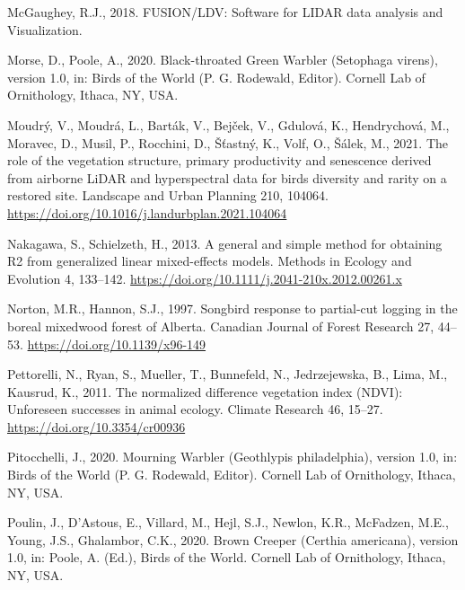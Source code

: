 \documentclass[
  12pt,
]{article}
\newlength{\cslhangindent}
\newlength{\cslentryspacingunit} %
\newenvironment{CSLReferences}[2] %
 {%
  \setlength{\parindent}{0pt}
  \ifodd #1
  \let\oldpar\par
  \def\par{\hangindent=\cslhangindent\oldpar}
  \fi
  \setlength{\parskip}{#2\cslentryspacingunit}
 }%
 {}
\begin{document}
\begin{CSLReferences}{1}{0}
\leavevmode{}%
McGaughey, R.J., 2018. {FUSION}/{LDV}: {Software} for {LIDAR} data analysis and {Visualization}.

\leavevmode{}%
Morse, D., Poole, A., 2020. Black-throated {Green} {Warbler} ({Setophaga} virens), version 1.0, in: Birds of the {World} ({P}. {G}. {Rodewald}, {Editor}). Cornell Lab of Ornithology, Ithaca, NY, USA.

\leavevmode{}%
Moudrý, V., Moudrá, L., Barták, V., Bejček, V., Gdulová, K., Hendrychová, M., Moravec, D., Musil, P., Rocchini, D., Šťastný, K., Volf, O., Šálek, M., 2021. The role of the vegetation structure, primary productivity and senescence derived from airborne {LiDAR} and hyperspectral data for birds diversity and rarity on a restored site. Landscape and Urban Planning 210, 104064. \url{https://doi.org/10.1016/j.landurbplan.2021.104064}

\leavevmode{}%
Nakagawa, S., Schielzeth, H., 2013. A general and simple method for obtaining {R2} from generalized linear mixed-effects models. Methods in Ecology and Evolution 4, 133--142. \url{https://doi.org/10.1111/j.2041-210x.2012.00261.x}

\leavevmode{}%
Norton, M.R., Hannon, S.J., 1997. Songbird response to partial-cut logging in the boreal mixedwood forest of {Alberta}. Canadian Journal of Forest Research 27, 44--53. \url{https://doi.org/10.1139/x96-149}

\leavevmode{}%
Pettorelli, N., Ryan, S., Mueller, T., Bunnefeld, N., Jedrzejewska, B., Lima, M., Kausrud, K., 2011. The normalized difference vegetation index ({NDVI}): Unforeseen successes in animal ecology. Climate Research 46, 15--27. \url{https://doi.org/10.3354/cr00936}

\leavevmode{}%
Pitocchelli, J., 2020. Mourning {Warbler} ({Geothlypis} philadelphia), version 1.0, in: Birds of the {World} ({P}. {G}. {Rodewald}, {Editor}). Cornell Lab of Ornithology, Ithaca, NY, USA.

\leavevmode{}%
Poulin, J., D'Astous, E., Villard, M., Hejl, S.J., Newlon, K.R., McFadzen, M.E., Young, J.S., Ghalambor, C.K., 2020. Brown {Creeper} ({Certhia} americana), version 1.0, in: Poole, A. (Ed.), Birds of the {World}. Cornell Lab of Ornithology, Ithaca, NY, USA.


\end{CSLReferences}
\end{document}
